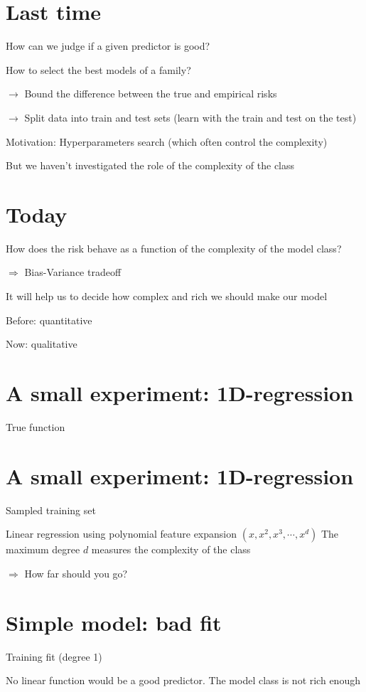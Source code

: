\section*{Last time}
How can we judge if a given predictor is good?

How to select the best models of a family?

$\rightarrow$ Bound the difference between the true and empirical risks

$\rightarrow$ Split data into train and test sets (learn with the train and test on the test)

Motivation: Hyperparameters search (which often control the complexity)

But we haven't investigated the role of the complexity of the class

\section*{Today}
How does the risk behave as a function of the complexity of the model class?

$\Rightarrow$ Bias-Variance tradeoff

It will help us to decide how complex and rich we should make our model

Before: quantitative

Now: qualitative

\section*{A small experiment: 1D-regression}
True function



\section*{A small experiment: 1D-regression}
Sampled training set


Linear regression using polynomial feature expansion $\left(x, x^{2}, x^{3}, \cdots, x^{d}\right)$ The maximum degree $d$ measures the complexity of the class

$\Rightarrow$ How far should you go?

\section*{Simple model: bad fit}
Training fit (degree 1)



No linear function would be a good predictor. The model class is not rich enough


